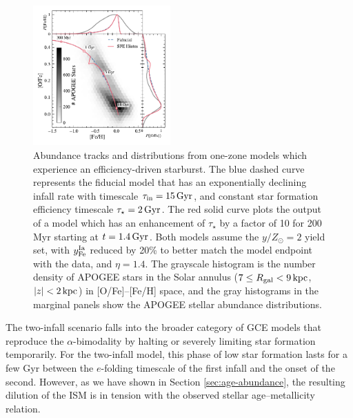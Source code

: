 \documentclass[twocolumn,twocolappendix,linenumbers]{aastex631}
\newcommand{\yZ}[1]{$y/Z_\odot=#1$}
\newcommand{\kpc}{\,{\rm kpc}}
\newcommand{\Gyr}{\,{\rm Gyr}}
\newcommand{\onecolumn}{0.47\textwidth}
\begin{document}
\begin{figure}
    \centering
    \includegraphics[width=\onecolumn]{figures/sfe_hiatus.pdf}
    \caption{Abundance tracks and distributions from one-zone models which experience an efficiency-driven starburst. The blue dashed curve represents the fiducial model that has an exponentially declining infall rate with timescale $\tau_{\rm in}=15\Gyr$, and constant star formation efficiency timescale $\tau_\star=2\,{\rm Gyr}$. The red solid curve plots the output of a model which has an enhancement of $\tau_\star$ by a factor of 10 for 200 Myr starting at $t=1.4\,{\rm Gyr}$. Both models assume the \yZ{2} yield set, with $y_{\rm Fe}^{\rm Ia}$ reduced by 20\% to better match the model endpoint with the data, and $\eta=1.4$. The grayscale histogram is the number density of APOGEE stars in the Solar annulus ($7\leq R_{\rm gal}< 9\kpc$, $|z|<2\kpc$) in [O/Fe]--[Fe/H] space, and the gray histograms in the marginal panels show the APOGEE stellar abundance distributions.}
    \label{fig:onezone-sfe-hiatus}
\end{figure}

The two-infall scenario falls into the broader category of GCE models that reproduce the $\alpha$-bimodality by halting or severely limiting star formation temporarily. For the two-infall model, this phase of low star formation lasts for a few Gyr between the $e$-folding timescale of the first infall and the onset of the second. However, as we have shown in Section \ref{sec:age-abundance}, the resulting dilution of the ISM is in tension with the observed stellar age--metallicity relation.
\end{document}
